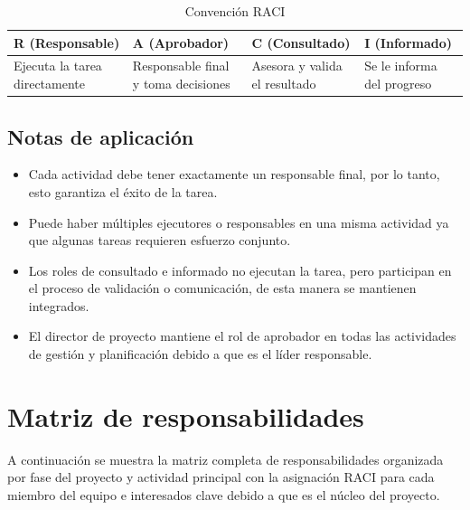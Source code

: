 \documentclass[11pt,spanish]{article}
\begin{document}
\begin{table}[H]
\centering
\caption{Convención RACI}
\label{tab:convencion-raci}
{\small
\setlength{\tabcolsep}{4pt}
\begin{tabularx}{\textwidth}{Y Y Y Y}
\toprule
\textbf{R (Responsable)} & \textbf{A (Aprobador)} & \textbf{C (Consultado)} & \textbf{I (Informado)} \\
\midrule
Ejecuta la tarea directamente & Responsable final y toma decisiones & Asesora y valida el resultado & Se le informa del progreso \\
\bottomrule
\end{tabularx}
}
\end{table}


\subsection{Notas de aplicación}

\begin{itemize}[leftmargin=*]

    \item Cada actividad debe tener exactamente un responsable final, por lo tanto, esto garantiza el éxito de la tarea.

    \item Puede haber múltiples ejecutores o responsables en una misma actividad ya que algunas tareas requieren esfuerzo conjunto.

    \item Los roles de consultado e informado no ejecutan la tarea, pero participan en el proceso de validación o comunicación, de esta manera se mantienen integrados.

    \item El director de proyecto mantiene el rol de aprobador en todas las actividades de gestión y planificación debido a que es el líder responsable.

\end{itemize}

\section{Matriz de responsabilidades}

A continuación se muestra la matriz completa de responsabilidades organizada por fase del proyecto y actividad principal con la asignación RACI para cada miembro del equipo e interesados clave debido a que es el núcleo del proyecto.
\end{document}
